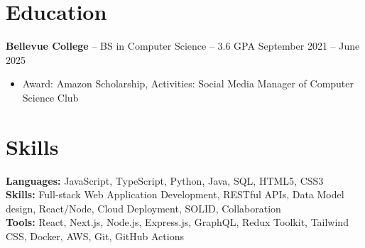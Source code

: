 \documentclass[11pt]{article}       %
\begin{document}

\vspace{-18.5pt}

\section*{Education}
\textbf{Bellevue College} -- BS in Computer Science -- 3.6 GPA \hfill September 2021 -- June 2025\\
\vspace{-9pt}
\begin{itemize}
  \item Award: Amazon Scholarship, Activities: Social Media Manager of Computer Science Club
\end{itemize}

\vspace{-18.5pt}

\section*{Skills}
\textbf{Languages:} JavaScript, TypeScript, Python, Java, SQL, HTML5, CSS3\\
\textbf{Skills:} Full-stack Web Application Development, RESTful APIs, Data Model design, React/Node, Cloud Deployment, SOLID, Collaboration\\
\textbf{Tools:} React, Next.js, Node.js, Express.js, GraphQL, Redux Toolkit, Tailwind CSS, Docker, AWS, Git, GitHub Actions

\vspace{-6.5pt}
\end{document}
